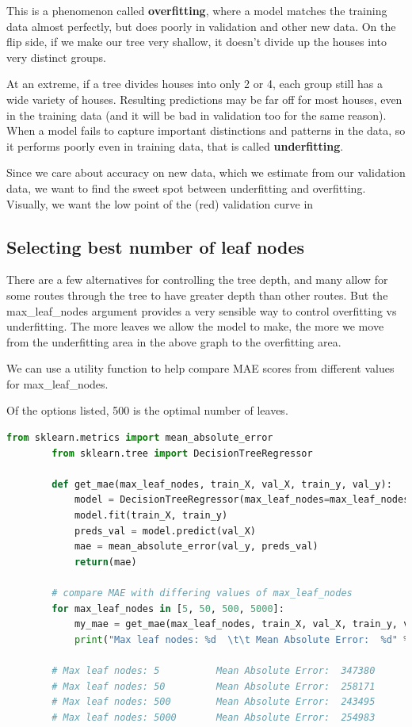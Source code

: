 \documentclass[11pt]{article}
\begin{document}
    This is a phenomenon called \textbf{overfitting}, where a model matches the training data almost perfectly, but does poorly in validation and other new data.
    On the flip side, if we make our tree very shallow, it doesn't divide up the houses into very distinct groups.

    At an extreme, if a tree divides houses into only 2 or 4, each group still has a wide variety of houses.
    Resulting predictions may be far off for most houses, even in the training data (and it will be bad in validation too for the same reason).
    When a model fails to capture important distinctions and patterns in the data, so it performs poorly even in training data, that is called \textbf{underfitting}.

    Since we care about accuracy on new data, which we estimate from our validation data, we want to find the sweet spot between underfitting and overfitting.
    Visually, we want the low point of the (red) validation curve in

    \subsection{Selecting best number of leaf nodes}\label{subsec:selecting_number_of_leafs}
    There are a few alternatives for controlling the tree depth, and many allow for some routes through the tree to have greater depth than other routes. But the max_leaf_nodes argument provides a very sensible way to control overfitting vs underfitting. The more leaves we allow the model to make, the more we move from the underfitting area in the above graph to the overfitting area.

    We can use a utility function to help compare MAE scores from different values for max\_leaf\_nodes.

    Of the options listed, 500 is the optimal number of leaves.

    \begin{lstlisting}[style=light, language=Python,label={lst:vectorimg},caption=Computing MAE for different value of leaf nodes]
        from sklearn.metrics import mean_absolute_error
        from sklearn.tree import DecisionTreeRegressor

        def get_mae(max_leaf_nodes, train_X, val_X, train_y, val_y):
            model = DecisionTreeRegressor(max_leaf_nodes=max_leaf_nodes, random_state=0)
            model.fit(train_X, train_y)
            preds_val = model.predict(val_X)
            mae = mean_absolute_error(val_y, preds_val)
            return(mae)

        # compare MAE with differing values of max_leaf_nodes
        for max_leaf_nodes in [5, 50, 500, 5000]:
            my_mae = get_mae(max_leaf_nodes, train_X, val_X, train_y, val_y)
            print("Max leaf nodes: %d  \t\t Mean Absolute Error:  %d" %(max_leaf_nodes, my_mae))

        # Max leaf nodes: 5  		 Mean Absolute Error:  347380
        # Max leaf nodes: 50  		 Mean Absolute Error:  258171
        # Max leaf nodes: 500  		 Mean Absolute Error:  243495
        # Max leaf nodes: 5000       Mean Absolute Error:  254983
    \end{lstlisting}
\end{document}
